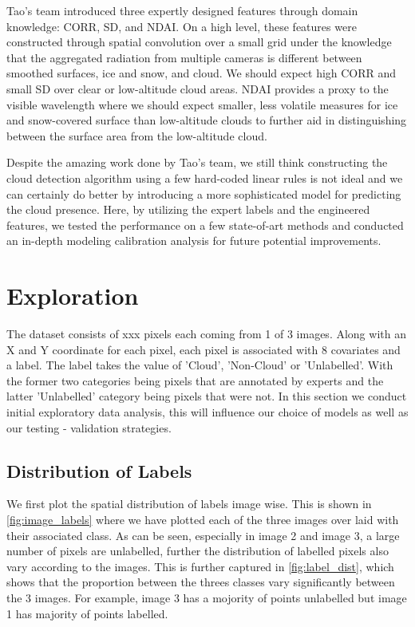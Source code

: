 \documentclass[11pt, letterpaper, journal]{IEEEtran}
\begin{document}
Tao's team introduced three expertly designed features through domain knowledge: CORR, SD, and NDAI. On a high level, these features were constructed through spatial convolution over a small grid under the knowledge that the aggregated radiation from multiple cameras is different between smoothed surfaces, ice and snow, and cloud. We should expect high CORR and small SD over clear or low-altitude cloud areas. NDAI provides a proxy to the visible wavelength where we should expect smaller, less volatile measures for ice and snow-covered surface than low-altitude clouds to further aid in distinguishing between the surface area from the low-altitude cloud.

Despite the amazing work done by Tao's team, we still think constructing the cloud detection algorithm using a few hard-coded linear rules is not ideal and we can certainly do better by introducing a more sophisticated model for predicting the cloud presence. Here, by utilizing the expert labels and the engineered features, we tested the performance on a few state-of-art methods and conducted an in-depth modeling calibration analysis for future potential improvements. 

\section{Exploration}
The dataset consists of xxx pixels each coming from 1 of 3 images. Along with an X and Y coordinate for each pixel, each pixel is associated with 8 covariates and a label. The label takes the value of 'Cloud', 'Non-Cloud' or 'Unlabelled'. With the former two categories being pixels that are annotated by experts and the latter 'Unlabelled' category being pixels that were not. In this section we conduct initial exploratory data analysis, this will influence our choice of models as well as our testing - validation strategies.

\subsection{Distribution of Labels}
We first plot the spatial distribution of labels image wise. This is shown in \ref{fig:image_labels} where we have plotted each of the three images over laid with their associated class. As can be seen, especially in image 2 and image 3, a large number of pixels are unlabelled, further the distribution of labelled pixels also vary according to the images. This is further captured in \ref{fig:label_dist}, which shows that the proportion between the threes classes vary significantly between the 3 images. For example, image 3 has a mojority of points unlabelled but image 1 has majority of points labelled.
\end{document}
